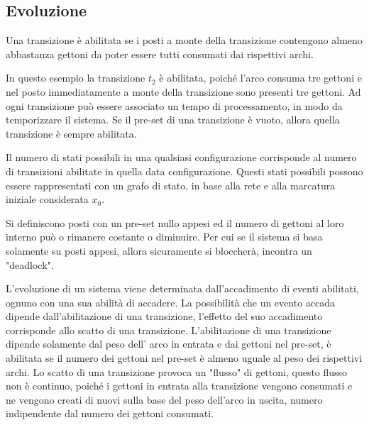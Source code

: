 \documentclass{article}
\numberwithin{equation}{subsection}
\begin{document}
\subsection{Evoluzione}

Una transizione è abilitata se i posti a monte della transizione contengono almeno abbastanza gettoni da poter essere tutti consumati dai rispettivi archi. 

\begin{center}
\end{center}

In questo esempio la transizione $t_2$ è abilitata, poiché l'arco consuma tre gettoni e nel posto immediatamente a monte della transizione sono presenti tre gettoni. 
Ad ogni transizione può essere associato un tempo di processamento, in modo da temporizzare il sistema. Se il pre-set di una transizione è vuoto, allora quella transizione 
è sempre abilitata. 

Il numero di stati possibili in una qualsiasi configurazione corrisponde al numero di transizioni abilitate in quella data configurazione. Questi stati possibili possono 
essere rappresentati con un grafo di stato, in base alla rete e alla marcatura iniziale considerata $x_0$. 

Si definiscono posti con un pre-set nullo appesi ed il numero di gettoni al loro interno può o rimanere costante o diminuire. Per cui se il sistema si basa solamente su posti 
appesi, allora sicuramente si bloccherà, incontra un "deadlock". 


L'evoluzione di un sistema viene determinata dall'accadimento di eventi abilitati, ognuno con una sua abilità di accadere. La possibilità che un evento accada dipende dall'abilitazione di una transizione, l'effetto del suo accadimento corrisponde allo scatto di una transizione. L'abilitazione di una transizione dipende solamente dal peso dell'
arco in entrata e dai gettoni nel pre-set, è abilitata se il numero dei gettoni nel pre-set è almeno uguale al peso dei rispettivi archi. 
Lo scatto di una transizione provoca un "flusso" di gettoni, questo flusso non è continuo, poiché i gettoni in entrata alla transizione vengono consumati e ne vengono creati 
di nuovi sulla base del peso dell'arco in uscita, numero indipendente dal numero dei gettoni consumati. 
\end{document}
